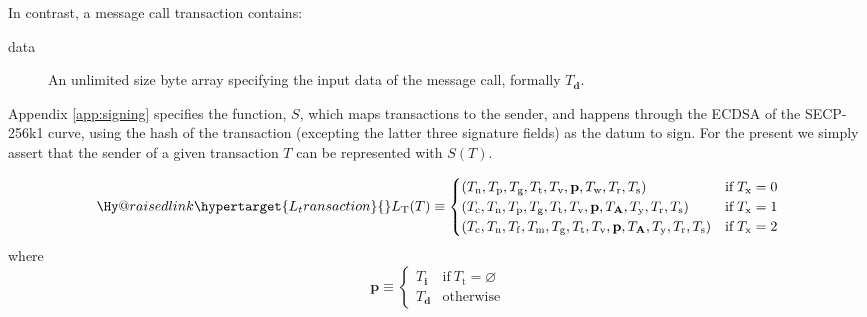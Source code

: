 \documentclass[9pt,oneside]{amsart}
\makeatletter
\newcommand{\linkdest}[1]{\Hy@raisedlink{\hypertarget{#1}{}}}
\makeatother
\begin{document}
\begin{multicols}{2}
In contrast, a message call transaction contains:

\begin{description}
\item[data] An unlimited size byte array specifying the input data of the message call, formally $T_{\mathbf{d}}$.
\end{description}

Appendix \ref{app:signing} specifies the function, $S$, which maps transactions to the sender, and happens through the ECDSA of the SECP-256k1 curve, using the hash of the transaction (excepting the latter three signature fields) as the datum to sign. For the present we simply assert that the sender of a given transaction $T$ can be represented with $S(T)$.

\begin{equation}
\linkdest{L_transaction} L_{\mathrm{T}}(T) \equiv \begin{cases}
(T_{\mathrm{n}}, T_{\mathrm{p}}, T_{\mathrm{g}}, T_{\mathrm{t}}, T_{\mathrm{v}}, \mathbf{p}, T_{\mathrm{w}}, T_{\mathrm{r}}, T_{\mathrm{s}}) & \text{if} \; T_{\mathrm{x}} = 0 \\
(T_{\mathrm{c}}, T_{\mathrm{n}}, T_{\mathrm{p}}, T_{\mathrm{g}}, T_{\mathrm{t}}, T_{\mathrm{v}}, \mathbf{p}, T_{\mathbf{A}}, T_{\mathrm{y}}, T_{\mathrm{r}}, T_{\mathrm{s}}) & \text{if} \; T_{\mathrm{x}} = 1 \\
(T_{\mathrm{c}}, T_{\mathrm{n}}, T_{\mathrm{f}}, T_{\mathrm{m}}, T_{\mathrm{g}}, T_{\mathrm{t}}, T_{\mathrm{v}}, \mathbf{p}, T_{\mathbf{A}}, T_{\mathrm{y}}, T_{\mathrm{r}}, T_{\mathrm{s}}) & \text{if} \; T_{\mathrm{x}} = 2 \\
\end{cases}
\end{equation}
where
\begin{equation}
\mathbf{p} \equiv \begin{cases}
T_{\mathbf{i}} & \text{if}\ T_{\mathrm{t}} = \varnothing \\
T_{\mathbf{d}} & \text{otherwise}
\end{cases}
\end{equation}


\end{multicols}
\end{document}
